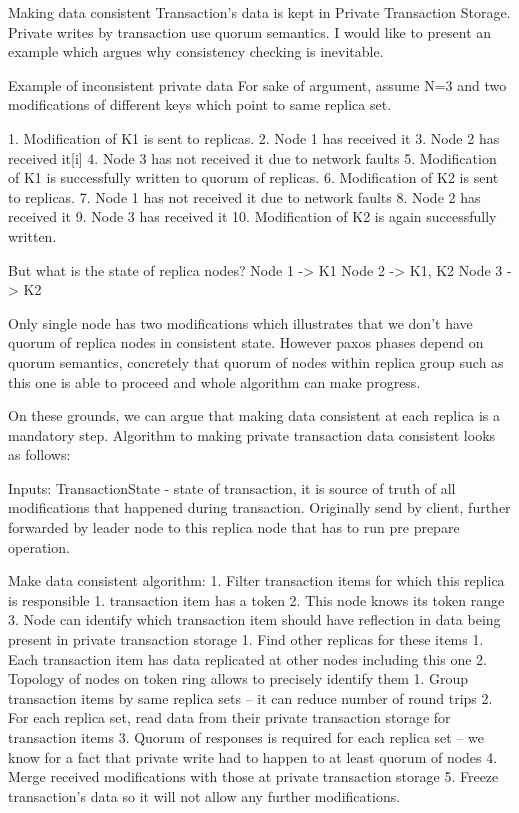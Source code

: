                 Making data consistent
Transaction’s data is kept in Private Transaction Storage. Private writes by transaction use quorum semantics. I would like to present an example which argues why consistency checking is inevitable.


Example of inconsistent private data
For sake of argument, assume N=3 and two modifications of different keys which point to same replica set.


1. Modification of K1 is sent to replicas.
2. Node 1 has received it
3. Node 2 has received it[i]
4. Node 3 has not received it due to network faults
5. Modification of K1 is successfully written to quorum of replicas.
6. Modification of K2 is sent to replicas.
7. Node 1 has not received it due to network faults
8. Node 2 has received it
9. Node 3 has received it
10. Modification of K2 is again successfully written.


But what is the state of replica nodes?
Node 1 -> { K1 }
Node 2 -> { K1, K2 }
Node 3 -> { K2 }


Only single node has two modifications which illustrates that we don’t have quorum of replica nodes in consistent state. However paxos phases depend on quorum semantics, concretely that quorum of nodes within replica group such as this one is able to proceed and whole algorithm can make progress. 


On these grounds, we can argue that making data consistent at each replica is a mandatory step.
Algorithm to making private transaction data consistent looks as follows:


Inputs:
        TransactionState - state of transaction, it is source of truth of all modifications that happened during transaction. Originally send by client, further forwarded by leader node to this replica node that has to run pre prepare operation.


        Make data consistent algorithm:        
1. Filter transaction items for which this replica is responsible
   1. transaction item has a token
   2. This node knows its token range
   3. Node can identify which transaction item should have reflection in data being present in private transaction storage
1. Find other replicas for these items
   1. Each transaction item has data replicated at other nodes including this one
   2. Topology of nodes on token ring allows to precisely identify them
1. Group transaction items by same replica sets -- it can reduce number of round trips
2. For each replica set, read data from their private transaction storage for transaction items
3. Quorum of responses is required for each replica set -- we know for a fact that private write had to happen to at least quorum of nodes
4. Merge received modifications with those at private transaction storage
5. Freeze transaction’s data so it will not allow any further modifications.


